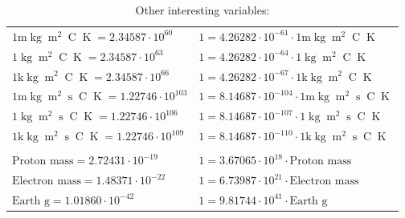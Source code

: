 \begin{center}
\begin{longtable}{l l}
{\color{gray}$1 \bm{\mathrm{ m}}\operatorname{kg}{\operatorname{m}^2}{}{\operatorname{C}}{\operatorname{K}} = 2.34587\cdot10^{60} $}   & {\color{gray}$ 1 = 4.26282\cdot10^{-61} \cdot 1 \bm{\mathrm{ m}}\operatorname{kg}{\operatorname{m}^2}{}{\operatorname{C}}{\operatorname{K}}$}  \\
{\color{black}$1 \bm{\mathrm{ }}\operatorname{kg}{\operatorname{m}^2}{}{\operatorname{C}}{\operatorname{K}} = 2.34587\cdot10^{63} $}   & {\color{black}$ 1 = 4.26282\cdot10^{-64} \cdot 1 \bm{\mathrm{ }}\operatorname{kg}{\operatorname{m}^2}{}{\operatorname{C}}{\operatorname{K}}$}  \\
{\color{gray}$1 \bm{\mathrm{ k}}\operatorname{kg}{\operatorname{m}^2}{}{\operatorname{C}}{\operatorname{K}} = 2.34587\cdot10^{66} $}   & {\color{gray}$ 1 = 4.26282\cdot10^{-67} \cdot 1 \bm{\mathrm{ k}}\operatorname{kg}{\operatorname{m}^2}{}{\operatorname{C}}{\operatorname{K}}$}  \\
{\color{gray}$1 \bm{\mathrm{ m}}\operatorname{kg}{\operatorname{m}^2}{\operatorname{s}}{\operatorname{C}}{\operatorname{K}} = 1.22746\cdot10^{103} $}   & {\color{gray}$ 1 = 8.14687\cdot10^{-104} \cdot 1 \bm{\mathrm{ m}}\operatorname{kg}{\operatorname{m}^2}{\operatorname{s}}{\operatorname{C}}{\operatorname{K}}$}  \\
{\color{black}$1 \bm{\mathrm{ }}\operatorname{kg}{\operatorname{m}^2}{\operatorname{s}}{\operatorname{C}}{\operatorname{K}} = 1.22746\cdot10^{106} $}   & {\color{black}$ 1 = 8.14687\cdot10^{-107} \cdot 1 \bm{\mathrm{ }}\operatorname{kg}{\operatorname{m}^2}{\operatorname{s}}{\operatorname{C}}{\operatorname{K}}$}  \\
{\color{gray}$1 \bm{\mathrm{ k}}\operatorname{kg}{\operatorname{m}^2}{\operatorname{s}}{\operatorname{C}}{\operatorname{K}} = 1.22746\cdot10^{109} $}   & {\color{gray}$ 1 = 8.14687\cdot10^{-110} \cdot 1 \bm{\mathrm{ k}}\operatorname{kg}{\operatorname{m}^2}{\operatorname{s}}{\operatorname{C}}{\operatorname{K}}$}  \\
\caption*{Other interesting variables:}\\{\color{black}$\textrm{Proton mass} = 2.72431\cdot10^{-19} $}   & {\color{black}$ 1 = 3.67065\cdot10^{18} \cdot \textrm{Proton mass}$}  \\
{\color{black}$\textrm{Electron mass} = 1.48371\cdot10^{-22} $}   & {\color{black}$ 1 = 6.73987\cdot10^{21} \cdot \textrm{Electron mass}$}  \\
{\color{black}$\textrm{Earth g} = 1.01860\cdot10^{-42} $}   & {\color{black}$ 1 = 9.81744\cdot10^{41} \cdot \textrm{Earth g}$}  \\

\end{longtable}
\end{center}

